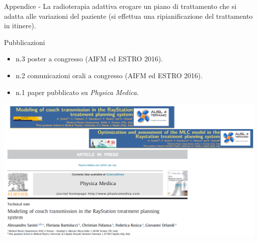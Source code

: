 \documentclass{beamer}
\begin{document}
\begin{frame}{Appendice - La radioterapia adattiva}
 erogare un piano di trattamento che si adatta alle variazioni del paziente (si effettua una ripianificazione del trattamento in itinere).
\end{frame}





\begin{frame}[t]{Pubblicazioni}
\begin{itemize}
\tiny
\item n.3 poster a congresso (AIFM ed ESTRO 2016).
\item n.2 comunicazioni orali a congresso (AIFM ed ESTRO 2016).
\item n.1 paper pubblicato su \textit{Physica Medica}.
\end{itemize}
\begin{center}
\includegraphics[width=\textwidth]{./img/Pub1.png}
\end{center}
\end{frame}
\end{document}
